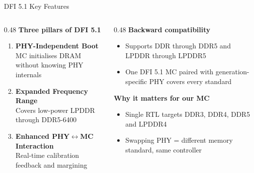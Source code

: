 \documentclass[aspectratio=169,10pt]{beamer}
\begin{document}
\begin{frame}{DFI 5.1 Key Features}
\begin{columns}[T]

\begin{column}{0.48\textwidth}
  \vspace{6pt}
  \textbf{\color{ddrblue}Three pillars of DFI 5.1}
  \begin{enumerate}\setlength\itemsep{8pt}
    \item \textbf{PHY-Independent Boot}\\
          MC initialises DRAM without knowing PHY internals
    \item \textbf{Expanded Frequency Range}\\
          Covers low-power LPDDR through DDR5-6400
    \item \textbf{Enhanced PHY$\leftrightarrow$MC Interaction}\\
          Real-time calibration feedback and margining
  \end{enumerate}
\end{column}

\begin{column}{0.48\textwidth}
  \vspace{6pt}
  \textbf{\color{ddrgreen}Backward compatibility}
  \begin{itemize}\setlength\itemsep{8pt}
    \item Supports DDR through DDR5 and LPDDR through LPDDR5
    \item One DFI 5.1 MC paired with generation-specific PHY covers every standard
  \end{itemize}

  \vspace{10pt}
  \textbf{\color{ddrred}Why it matters for our MC}
  \begin{itemize}\setlength\itemsep{8pt}
    \item Single RTL targets DDR3, DDR4, DDR5 and LPDDR4
    \item Swapping PHY = different memory standard, same controller
  \end{itemize}
\end{column}

\end{columns}
\end{frame}
\end{document}
